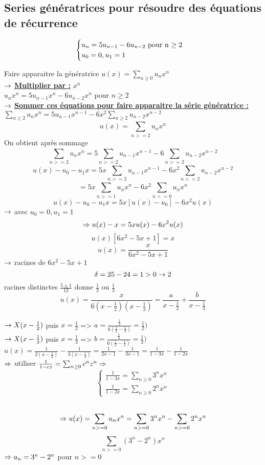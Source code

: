 \subsection{Series génératrices pour résoudre des équations de récurrence}
\begin{exercice}
\[ \begin{cases}
	u_n = 5u_{n-1} - 6u_{n-2}$ pour n $\ge2\\
	u_0=0,u_1 = 1
\end{cases}\]

Faire apparaitre la génératrice $u(x) = \sum_{n\ge0} u_n x^n$\\

$\rightarrow$ \underline{\textbf{Multiplier par :}} $x^n$\\
$u_nx^n = 5u_{n-1}x^n - 6u_{n-2}x^n$ pour $n \ge 2$\\

$\rightarrow$ \textbf{\underline{Sommer ces équations pour faire apparaitre la série génératrice :}}\\
$\sum_{n\ge2}u_nx^n = 5u_{n-1}x^{n-1} - 6x^2 \sum_{n\ge2} u_{n-2}x^{n-2}$\\

\[ u(x) = \sum_{n>=2}^{} u_nx^n\]
On obtient après sommage
\[ \sum_{n>=2}^{} u_nx^n = 5\sum_{n>=2}^{} u_{n-1}x^{n-1} - 6\sum_{n>=2}^{} u_{n-2}x^{n-2}\]
\[ u(x)-u_0-u_1x = 5x\sum_{n>=2}^{} u_{n-1}x^{n-1} - 6x^2\sum_{n>=2}^{} u_{n-2}x^{n-2}\]
\[ = 5x\sum_{n>=1}^{} u_{n}x^{n} - 6x^2\sum_{n>=0}^{} u_{n}x^{n}\]
\[ u(x)-u_0-u_1x = 5x[u(x)-u_0]-6x^2u(x)\]
$\rightarrow$ avec $u_0 = 0, u_1 = 1$
\[\Rightarrow u(x) - x = 5xu(x) - 6x^2u(x)\]
\[u(x)[6x^2-5x+1]=x\]
\[u(x)=\frac{x}{6x^2-5x+1}\]
$\rightarrow$ racines de $6x^2-5x+1$
\[\delta = 25-24 = 1 >0 \rightarrow 2\] racines distinctes $\frac{5 \pm 1}{12}$ donne $\frac{1}{2}$ ou $\frac{1}{3}$
\[u(x)=\frac{x}{6(x-\frac{1}{2})(x-\frac{1}{3})}=\frac{a}{x-\frac{1}{2}}+\frac{b}{x-\frac{1}{3}}\]

$\rightarrow X(x-\frac{1}{2})$ puis $x = \frac{1}{2}$ => $a=\frac{\frac{1}{2}}{6(\frac{1}{2}-\frac{1}{3})} =  \frac{1}{2})$\\

$\rightarrow X(x-\frac{1}{3})$ puis $x = \frac{1}{3}$ => $b=\frac{\frac{1}{3}}{6(\frac{1}{3}-\frac{1}{2})} = \frac{1}{3})$\\

$u(x) = \frac{1}{2(x-\frac{1}{2})} - \frac{1}{3(x-\frac{1}{3})} = \frac{1}{2x-1}-\frac{1}{3x-1} = \frac{1}{1-3x} - \frac{1}{1-2x}$\\

$\Rightarrow$ utiliser $\frac{1}{1-cz} = \sum_{n \ge 0}c^nz^n \Rightarrow$ \[ \begin{cases}
	\frac{1}{1-3x} = \sum_{n\ge0}3^nx^n\\
	\frac{1}{1-2x} = \sum_{n\ge0}2^nx^n
\end{cases}\]\\

\[\Rightarrow u(x) = \sum_{n>=0}^{} u_{n}x^{n}=\sum_{n>=0}^{} 3^{n}x^{n}-\sum_{n>=0}^{} 2^{n}x^{n}\]
\[\sum_{n>=0}^{} (3^{n}-2^{n})x^{n}\]
$\Rightarrow u_{n} = 3^{n}-2^{n}$ pour $n>=0$

\end{exercice}

